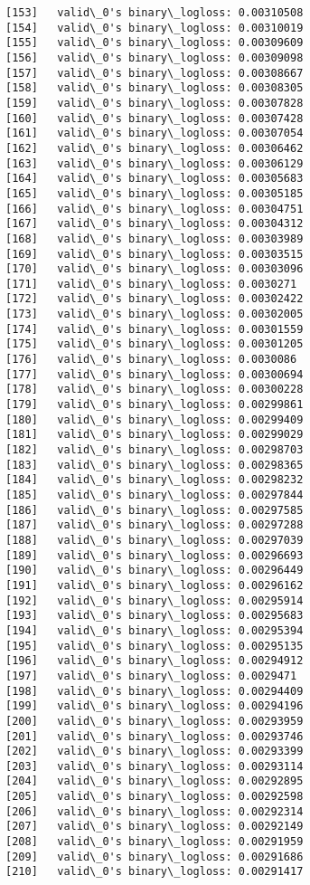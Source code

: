 \documentclass[11pt]{article}
\begin{document}
\begin{Verbatim}[commandchars=\\\{\}]
[153]	valid\_0's binary\_logloss: 0.00310508
[154]	valid\_0's binary\_logloss: 0.00310019
[155]	valid\_0's binary\_logloss: 0.00309609
[156]	valid\_0's binary\_logloss: 0.00309098
[157]	valid\_0's binary\_logloss: 0.00308667
[158]	valid\_0's binary\_logloss: 0.00308305
[159]	valid\_0's binary\_logloss: 0.00307828
[160]	valid\_0's binary\_logloss: 0.00307428
[161]	valid\_0's binary\_logloss: 0.00307054
[162]	valid\_0's binary\_logloss: 0.00306462
[163]	valid\_0's binary\_logloss: 0.00306129
[164]	valid\_0's binary\_logloss: 0.00305683
[165]	valid\_0's binary\_logloss: 0.00305185
[166]	valid\_0's binary\_logloss: 0.00304751
[167]	valid\_0's binary\_logloss: 0.00304312
[168]	valid\_0's binary\_logloss: 0.00303989
[169]	valid\_0's binary\_logloss: 0.00303515
[170]	valid\_0's binary\_logloss: 0.00303096
[171]	valid\_0's binary\_logloss: 0.0030271
[172]	valid\_0's binary\_logloss: 0.00302422
[173]	valid\_0's binary\_logloss: 0.00302005
[174]	valid\_0's binary\_logloss: 0.00301559
[175]	valid\_0's binary\_logloss: 0.00301205
[176]	valid\_0's binary\_logloss: 0.0030086
[177]	valid\_0's binary\_logloss: 0.00300694
[178]	valid\_0's binary\_logloss: 0.00300228
[179]	valid\_0's binary\_logloss: 0.00299861
[180]	valid\_0's binary\_logloss: 0.00299409
[181]	valid\_0's binary\_logloss: 0.00299029
[182]	valid\_0's binary\_logloss: 0.00298703
[183]	valid\_0's binary\_logloss: 0.00298365
[184]	valid\_0's binary\_logloss: 0.00298232
[185]	valid\_0's binary\_logloss: 0.00297844
[186]	valid\_0's binary\_logloss: 0.00297585
[187]	valid\_0's binary\_logloss: 0.00297288
[188]	valid\_0's binary\_logloss: 0.00297039
[189]	valid\_0's binary\_logloss: 0.00296693
[190]	valid\_0's binary\_logloss: 0.00296449
[191]	valid\_0's binary\_logloss: 0.00296162
[192]	valid\_0's binary\_logloss: 0.00295914
[193]	valid\_0's binary\_logloss: 0.00295683
[194]	valid\_0's binary\_logloss: 0.00295394
[195]	valid\_0's binary\_logloss: 0.00295135
[196]	valid\_0's binary\_logloss: 0.00294912
[197]	valid\_0's binary\_logloss: 0.0029471
[198]	valid\_0's binary\_logloss: 0.00294409
[199]	valid\_0's binary\_logloss: 0.00294196
[200]	valid\_0's binary\_logloss: 0.00293959
[201]	valid\_0's binary\_logloss: 0.00293746
[202]	valid\_0's binary\_logloss: 0.00293399
[203]	valid\_0's binary\_logloss: 0.00293114
[204]	valid\_0's binary\_logloss: 0.00292895
[205]	valid\_0's binary\_logloss: 0.00292598
[206]	valid\_0's binary\_logloss: 0.00292314
[207]	valid\_0's binary\_logloss: 0.00292149
[208]	valid\_0's binary\_logloss: 0.00291959
[209]	valid\_0's binary\_logloss: 0.00291686
[210]	valid\_0's binary\_logloss: 0.00291417

\end{Verbatim}
\end{document}
